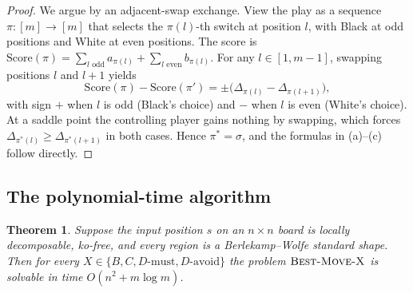\documentclass[11pt,a4paper]{amsart}
\newtheorem{theorem}{Theorem}[section]
\theoremstyle{definition}
\theoremstyle{remark}
\newcommand{\BMX}{\textsc{Best-Move-X}}
\begin{document}
\begin{proof}
We argue by an adjacent-swap exchange.
View the play as a sequence $\pi : [m] \to [m]$ that selects the
$\pi(l)$-th switch at position $l$, with Black at odd positions and
White at even positions. The score is
$\mathrm{Score}(\pi) = \sum_{l \text{ odd}} a_{\pi(l)} +
  \sum_{l \text{ even}} b_{\pi(l)}$.
For any $l \in [1, m-1]$, swapping positions $l$ and $l+1$ yields
\[
  \mathrm{Score}(\pi) - \mathrm{Score}(\pi')
  = \pm\bigl(\Delta_{\pi(l)} - \Delta_{\pi(l+1)}\bigr),
\]
with sign $+$ when $l$ is odd (Black's choice) and $-$ when $l$ is even
(White's choice). At a saddle point the controlling player gains nothing
by swapping, which forces $\Delta_{\pi^*(l)} \geq \Delta_{\pi^*(l+1)}$ in
both cases. Hence $\pi^* = \sigma$, and the formulas in (a)--(c) follow
directly.
\end{proof}

\subsection{The polynomial-time algorithm}

\begin{theorem}\label{thm:upper}
Suppose the input position $s$ on an $n \times n$ board is locally
decomposable, ko-free, and every region is a Berlekamp--Wolfe standard
shape. Then for every
$X \in \{B, C, D\text{-must}, D\text{-avoid}\}$ the problem $\BMX$ is
solvable in time $O(n^2 + m \log m)$.
\end{theorem}
\end{document}
